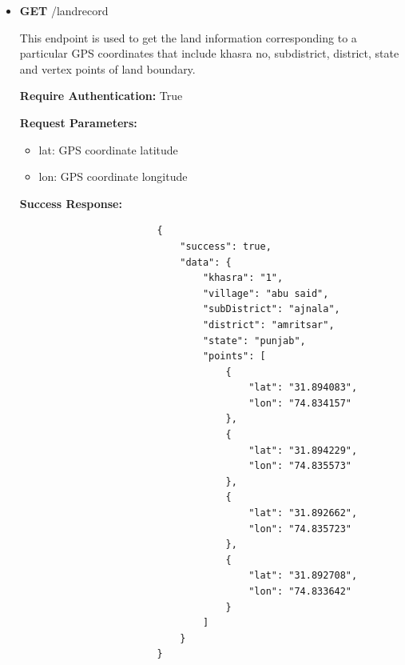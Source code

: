 \documentclass{article}
\begin{document}
\begin{itemize}
            \item \textbf{GET} /landrecord
                \begin{addmargin}[1em]{2em}%
                    This endpoint is used to get the land information corresponding to a particular GPS coordinates that include khasra no, subdistrict, district, state and vertex points of land boundary.
                    \par\textbf{Require Authentication:} True
                    \par\textbf{Request Parameters:}
                    \begin{itemize}
                        \item lat: GPS coordinate latitude
                        \item lon: GPS coordinate longitude
                    \end{itemize}
                    \par\textbf{Success Response:}
                    \begin{listing}[H]
                    \begin{verbatim}
                        {
                            "success": true,
                            "data": {
                                "khasra": "1",
                                "village": "abu said",
                                "subDistrict": "ajnala",
                                "district": "amritsar",
                                "state": "punjab",
                                "points": [
                                    {
                                        "lat": "31.894083",
                                        "lon": "74.834157"
                                    },
                                    {
                                        "lat": "31.894229",
                                        "lon": "74.835573"
                                    },
                                    {
                                        "lat": "31.892662",
                                        "lon": "74.835723"
                                    },
                                    {
                                        "lat": "31.892708",
                                        "lon": "74.833642"
                                    }
                                ]
                            }
                        }
                    \end{verbatim}
                   \end{listing}
                \end{addmargin}
           

\end{itemize}
\end{document}
